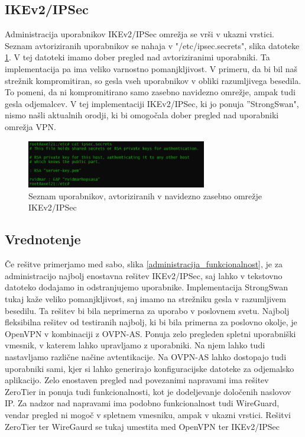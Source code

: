 \documentclass[a4paper, 12pt]{book}
\begin{document}
\subsection{IKEv2/IPSec}
Administracija uporabnikov IKEv2/IPSec omrežja se vrši v ukazni vrstici. Seznam avtoriziranih uporabnikov se nahaja v "/etc/ipsec.secrets", slika datoteke \ref{ipsec_auth}. V tej datoteki imamo dober pregled nad avtoriziranimi uporabniki. Ta implementacija pa ima veliko varnostno pomanjkljivost. V primeru, da bi bil naš strežnik kompromitiran, so gesla vseh uporabnikov v obliki razumljivega besedila. To pomeni, da ni kompromitirano samo zasebno navidezno omrežje, ampak tudi gesla odjemalcev. V tej implementaciji IKEv2/IPSec, ki jo ponuja ''StrongSwan", nismo našli aktualnih orodji, ki bi omogočala dober pregled nad uporabniki omrežja VPN.

\begin{figure}[H]
\begin{center}
\includegraphics[width=0.7\textwidth]{fotografije/ipsec_auth.png}
\end{center}
\caption{Seznam uporabnikov, avtoriziranih v navidezno zasebno omrežje IKEv2/IPSec \cite{rvidmar}}
\label{ipsec_auth}
\end{figure}

\subsection{Vrednotenje}
Če rešitve primerjamo med sabo, slika \ref{administracija_funkcionalnost}, je za administracijo najbolj enostavna rešitev IKEv2/IPSec, saj lahko v tekstovno datoteko dodajamo in odstranjujemo uporabnike. Implementacija StrongSwan tukaj kaže veliko pomanjkljivost, saj imamo na strežniku gesla v razumljivem besedilu. Ta rešitev bi bila neprimerna za uporabo v poslovnem svetu. Najbolj fleksibilna rešitev od testiranih najbolj, ki bi bila primerna za poslovno okolje, je OpenVPN v kombinaciji z OVPN-AS. Ponuja zelo pregleden spletni uporabniški vmesnik, v katerem lahko upravljamo z uporabniki. Na njem lahko tudi nastavljamo različne načine avtentikacije. Na OVPN-AS lahko dostopajo tudi uporabniki sami, kjer si lahko generirajo konfiguracijske datoteke za odjemalsko aplikacijo.
Zelo enostaven pregled nad povezanimi napravami ima rešitev ZeroTier in ponuja tudi funkcionalnosti, kot je dodeljevanje določenih naslovov IP. Za nadzor nad napravami ima podobno funkcionalnost tudi WireGuard, vendar pregled ni mogoč v spletnem vmesniku, ampak v ukazni vrstici. Rešitvi ZeroTier ter WireGaurd se tukaj umestita med OpenVPN ter IKEv2/IPSec
\end{document}
